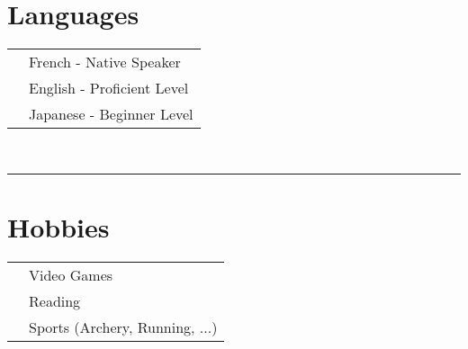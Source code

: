 \documentclass[oneside]{article}
\begin{document}
{\begin{minipage}[t][\textheight-2\fboxsep-2\fboxrule][t]{\dimexpr0.40\textwidth-2\fboxrule-2\fboxsep\relax}
        \section*{\large Languages}
        \begin{tabularx}{\textwidth}{cY}
            \faLanguage{} & French - Native Speaker \\
            \faLanguage{} & English - Proficient Level \\
            \faLanguage{} & Japanese - Beginner Level \\
        \end{tabularx}
        \vspace{.3cm}
        \\
        
        \rule{\linewidth}{0.4pt}
        \section*{\large Hobbies}
        \begin{tabularx}{\textwidth}{cY}
            \faGamepad{} & Video Games \\
            \faBookReader{} & Reading \\
            \faWalking{} & Sports (Archery, Running, ...) \\
        \end{tabularx}
        \vspace{.3cm}
        
        \vfill
        
        
    \end{minipage}
}
\hfill
\end{document}
